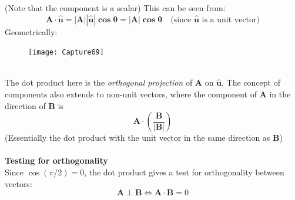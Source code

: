 \documentclass{report}
\begin{document}
(Note that the component is a scalar) This can be seen from:
\begin{equation*}
\mathbf{A\cdot\hat{u}=|A||\hat{u}|\cos\theta=|A|\cos\theta}\quad
\text{(since $\mathbf{\hat{u}}$ is a unit vector)}
\end{equation*}
Geometrically:
\begin{figure}[h]
\texttt{[image: Capture69]}\\
\centering
\end{figure}\\
The dot product here is the \textit{orthogonal projection} of $\mathbf{A}$ on 
$\mathbf{\hat{u}}$. The concept of components also extends to non-unit vectors, where
the component of $\mathbf{A}$ in the direction of $\mathbf{B}$ is 
\begin{equation*}
\mathbf{A\cdot\left(\frac{B}{|B|}\right)}
\end{equation*}
(Essentially the dot product with the unit vector in the same direction as $\mathbf{B}$)\\
\vspace{1mm}\\
\textbf{Testing for orthogonality}\\
Since $\cos(\pi/2)=0$, the dot product gives a test for orthogonality between vectors:
\begin{equation*}
\mathbf{A\perp B}\iff\mathbf{A\cdot B}=0
\end{equation*}
\newpage
\end{document}
